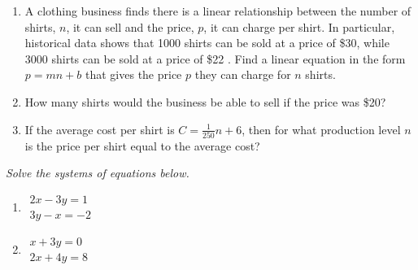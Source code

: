 \documentclass[10pt]{article}
\begin{document}
\begin{enumerate}
\setcounter{enumi}{\theenumCount}

\item A clothing business finds there is a linear relationship between the number of shirts, $n$, it can
sell and the price, $p$, it can charge per shirt. In particular, historical data shows that 1000
shirts can be sold at a price of \$30, while 3000 shirts can be sold at a price of \$22 . Find a
linear equation in the form $p = mn + b$ that gives the price $p$ they can charge for $n$ shirts.\vfill

\item How many shirts would the business be able to sell if the price was \$20? 
\vfill

\item If the average cost per shirt is $C = \tfrac{1}{250} n + 6$, then for what production level $n$ is the price per shirt equal to the average cost? 
\vfill
\setcounter{enumCount}{\theenumi}
\end{enumerate}


\noindent 
\textit{Solve the systems of equations below.}
\begin{multicols}{2}
\begin{enumerate}
\setcounter{enumi}{\theenumCount}
\item $\begin{array}{l} 2x - 3y = 1 \\ 3y - x = -2 \end{array}$ 
\item $\begin{array}{l} x + 3y = 0 \\ 2x + 4y = 8\end{array}$ 
\setcounter{enumCount}{\theenumi}
\end{enumerate}
\end{multicols}

\vfill
\end{document}
